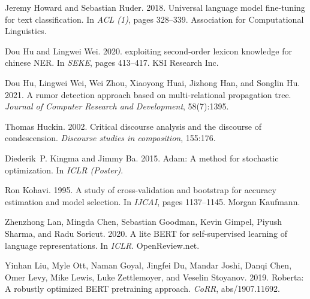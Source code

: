 \documentclass[11pt]{article}
\begin{document}
\begin{thebibliography}{31}
    Jeremy Howard and Sebastian Ruder. 2018.
    \newblock Universal language model fine-tuning for text classification.
    \newblock In \emph{{ACL} {(1)}}, pages 328--339. Association for Computational
      Linguistics.
    
    Dou Hu and Lingwei Wei. 2020.
     exploiting second-order lexicon knowledge for chinese
      {NER}.
    \newblock In \emph{{SEKE}}, pages 413--417. {KSI} Research Inc.
    
    Dou Hu, Lingwei Wei, Wei Zhou, Xiaoyong Huai, Jizhong Han, and Songlin Hu.
      2021.
    \newblock A rumor detection approach based on multi-relational propagation
      tree.
    \newblock \emph{Journal of Computer Research and Development}, 58(7):1395.
    
    Thomas Huckin. 2002.
    \newblock Critical discourse analysis and the discourse of condescension.
    \newblock \emph{Discourse studies in composition}, 155:176.
    
    Diederik~P. Kingma and Jimmy Ba. 2015.
    \newblock Adam: {A} method for stochastic optimization.
    \newblock In \emph{{ICLR} (Poster)}.
    
    Ron Kohavi. 1995.
    \newblock A study of cross-validation and bootstrap for accuracy estimation and
      model selection.
    \newblock In \emph{{IJCAI}}, pages 1137--1145. Morgan Kaufmann.
    
    Zhenzhong Lan, Mingda Chen, Sebastian Goodman, Kevin Gimpel, Piyush Sharma, and
      Radu Soricut. 2020.
     {A} lite {BERT} for self-supervised learning of language
      representations.
    \newblock In \emph{{ICLR}}. OpenReview.net.
    
    Yinhan Liu, Myle Ott, Naman Goyal, Jingfei Du, Mandar Joshi, Danqi Chen, Omer
      Levy, Mike Lewis, Luke Zettlemoyer, and Veselin Stoyanov. 2019.
    \newblock Roberta: {A} robustly optimized {BERT} pretraining approach.
    \newblock \emph{CoRR}, abs/1907.11692.
    

\end{thebibliography}
\end{document}
